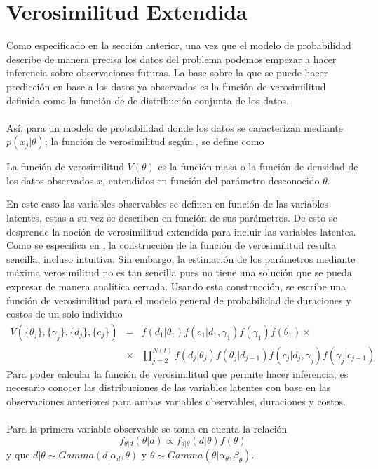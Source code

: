 \section{Verosimilitud Extendida}
Como especificado en la secci\'on anterior, una vez que el modelo de probabilidad describe de manera precisa los datos del problema podemos empezar a hacer inferencia sobre observaciones futuras. La base sobre la que se puede hacer predicci\'on en base a los datos ya observados es la funci\'on de verosimilitud definida como la funci\'on de de distribuci\'on conjunta de los datos.\\
\\
As\'i, para un modelo de probabilidad donde los datos se caracterizan mediante $p(x_j|\theta)$; la funci\'on de verosimilitud seg\'un \cite{held2014applied}, se define como
\begin{defi}
La funci\'on de verosimilitud $V(\theta)$ es la funci\'on masa o la funci\'on de densidad de los datos observados $x$, entendidos en funci\'on del par\'ametro desconocido $\theta$.
\end{defi}
En este caso las variables observables se definen en funci\'on de las variables latentes, estas a su vez se describen en funci\'on de sus par\'ametros. De esto se desprende la noci\'on de verosimilitud extendida para incluir las variables latentes. Como se especifica en \cite{pitt2002constructing}, la construcci\'on de la funci\'on de verosimilitud resulta sencilla, incluso intuitiva. Sin embargo, la estimaci\'on de los par\'ametros mediante m\'axima verosimilitud no es tan sencilla pues no tiene una soluci\'on que se pueda expresar de manera anal\'itica cerrada. Usando esta construcci\'on, se escribe una funci\'on de verosimilitud para el modelo general de probabilidad de duraciones y costos de un solo individuo\\
\begin{eqnarray}
V(\{\theta_j\},\{\gamma_j\},\{d_j\},\{c_j\}) &=& f(d_1|\theta_1)f(c_1|d_1,\gamma_1)f(\gamma_1) f(\theta_1)\times\nonumber\\
& \times & \prod_{j=2}^{N(t)} f(d_j|\theta_j)f(\theta_j|d_{j-1})f(c_j|d_j,\gamma_j)f(\gamma_j|c_{j-1})\nonumber
\end{eqnarray}
Para poder calcular la funci\'on de verosimilitud que permite hacer inferencia, es necesario conocer las distribuciones de las variables latentes con base en las observaciones anteriores para ambas variables observables, duraciones y costos.\\
\\Para la primera variable observable se toma en cuenta la relaci\'on 
\[f_{\theta|d}(\theta|d)\propto f_{d|\theta}(d|\theta)f(\theta)\]
y que $d|\theta \sim Gamma(d|\alpha_d,\theta)$ y $\theta \sim Gamma(\theta|\alpha_\theta,\beta_\theta)$.

